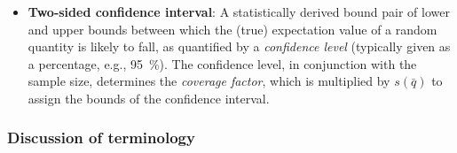 \begin{itemize}
\item {\bf Two-sided confidence interval}: A statistically derived bound pair of lower and upper bounds between which the (true) expectation value of a random quantity is likely to fall, as quantified by a {\it confidence level} (typically given as a percentage, e.g., 95~\%). The confidence level, in conjunction with the sample size, determines the {\it coverage factor}, which is multiplied by \hyperref[def:exp_st_dev_mean]{$s\left(\bar{q}\right)$} to assign the bounds of the confidence interval.


\end{itemize}

\subsubsection{Discussion of terminology}


